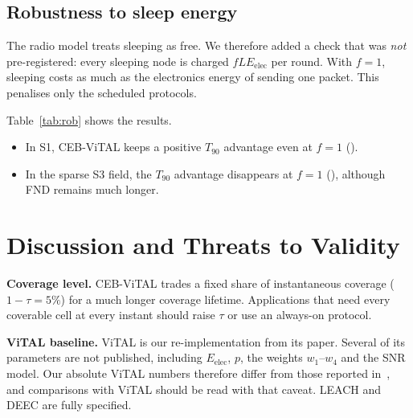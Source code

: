 \documentclass[journal]{IEEEtran}
\newcommand{\TN}{T_{90}}
\begin{document}
\begin{table}[t]
\caption{Ablation: change in CEB-ViTAL relative to each variant, shown as $\TN$ / FND / coverage integral. $^\dagger$The variant's mean $\TN$ is below 100 rounds, so a ratio is not meaningful.}\label{tab:abl}
\centering\footnotesize

\end{table}

\subsection{Robustness to sleep energy}
The radio model treats sleeping as free. We therefore added a check that was \emph{not} pre-registered: every sleeping node is charged $f L E_{\mathrm{elec}}$ per round. With $f=1$, sleeping costs as much as the electronics energy of sending one packet. This penalises only the scheduled protocols.

Table~\ref{tab:rob} shows the results.
\begin{itemize}
\item In S1, CEB-ViTAL keeps a positive $\TN$ advantage even at $f=1$ (\RobSoneFone{}).
\item In the sparse S3 field, the $\TN$ advantage disappears at $f=1$ (\RobSthreeFone{}), although FND remains much longer.
\end{itemize}

\begin{table}[t]
\caption{Sleep-energy robustness (post hoc). CEB-ViTAL versus the strongest always-on protocol, shown as $\TN$ / FND / coverage integral.}\label{tab:rob}
\centering\footnotesize

\end{table}

\section{Discussion and Threats to Validity}\label{sec:threats}
\textbf{Coverage level.} CEB-ViTAL trades a fixed share of instantaneous coverage ($1-\tau=5\%$) for a much longer coverage lifetime. Applications that need every coverable cell at every instant should raise $\tau$ or use an always-on protocol.

\textbf{ViTAL baseline.} ViTAL is our re-implementation from its paper. Several of its parameters are not published, including $E_{\mathrm{elec}}$, $p$, the weights $w_1$--$w_4$ and the SNR model. Our absolute ViTAL numbers therefore differ from those reported in~\cite{ali2025vital}, and comparisons with ViTAL should be read with that caveat. LEACH and DEEC are fully specified.
\end{document}
